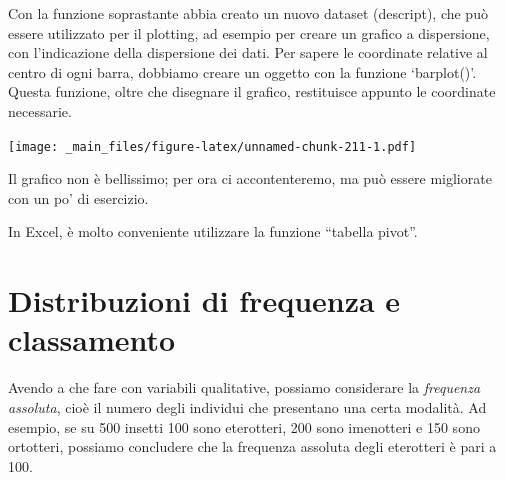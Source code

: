 \documentclass[a4paper,12pt,oneside]{book}
\newenvironment{Shaded}{\begin{snugshade}}{\end{snugshade}}
\newcommand{\KeywordTok}[1]{\textcolor[rgb]{0.13,0.29,0.53}{\textbf{#1}}}
\newcommand{\DataTypeTok}[1]{\textcolor[rgb]{0.13,0.29,0.53}{#1}}
\newcommand{\DecValTok}[1]{\textcolor[rgb]{0.00,0.00,0.81}{#1}}
\newcommand{\FloatTok}[1]{\textcolor[rgb]{0.00,0.00,0.81}{#1}}
\newcommand{\StringTok}[1]{\textcolor[rgb]{0.31,0.60,0.02}{#1}}
\newcommand{\OperatorTok}[1]{\textcolor[rgb]{0.81,0.36,0.00}{\textbf{#1}}}
\newcommand{\NormalTok}[1]{#1}
\theoremstyle{definition}
\theoremstyle{definition}
\theoremstyle{definition}
\theoremstyle{remark}
\begin{document}
Con la funzione soprastante abbia creato un nuovo dataset (descript),
che può essere utilizzato per il plotting, ad esempio per creare un
grafico a dispersione, con l'indicazione della dispersione dei dati. Per
sapere le coordinate relative al centro di ogni barra, dobbiamo creare
un oggetto con la funzione `barplot()'. Questa funzione, oltre che
disegnare il grafico, restituisce appunto le coordinate necessarie.

\begin{Shaded}
\end{Shaded}

\texttt{[image: \_main\_files/figure-latex/unnamed-chunk-211-1.pdf]}

Il grafico non è bellissimo; per ora ci accontenteremo, ma può essere
migliorate con un po' di esercizio.

In Excel, è molto conveniente utilizzare la funzione ``tabella pivot''.

\section*{Distribuzioni di frequenza e
classamento}\label{distribuzioni-di-frequenza-e-classamento}

Avendo a che fare con variabili qualitative, possiamo considerare la
\emph{frequenza assoluta}, cioè il numero degli individui che presentano
una certa modalità. Ad esempio, se su 500 insetti 100 sono eterotteri,
200 sono imenotteri e 150 sono ortotteri, possiamo concludere che la
frequenza assoluta degli eterotteri è pari a 100.
\end{document}
